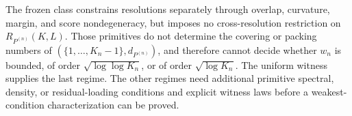 The frozen class constrains resolutions separately through overlap, curvature, margin, and score nondegeneracy, but imposes no cross-resolution restriction on \(R_{P^{(n)}}(K,L)\).  Those primitives do not determine the covering or packing numbers of \((\{1,\ldots,K_n-1\},d_{P^{(n)}})\), and therefore cannot decide whether \(w_n\) is bounded, of order \(\sqrt{\log\log K_n}\), or of order \(\sqrt{\log K_n}\).  The uniform witness supplies the last regime.  The other regimes need additional primitive spectral, density, or residual-loading conditions and explicit witness laws before a weakest-condition characterization can be proved.